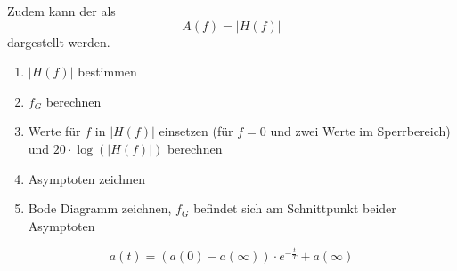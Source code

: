 \documentclass[12pt, a4paper, twoside]{scrartcl}
\begin{document}
Zudem kann der   als
\[A(f) = |H(f)|\]
dargestellt werden.


\begin{enumerate}
\item \(|H(f)|\) bestimmen
\item \(f_G\) berechnen
\item Werte für \(f\) in \(|H(f)|\) einsetzen (für \(f=0\) und zwei Werte im Sperrbereich) und \(20\cdot\log(|H(f)|)\) berechnen
\item Asymptoten zeichnen
\item Bode Diagramm zeichnen, \(f_G\) befindet sich am Schnittpunkt beider Asymptoten
\end{enumerate}

\[a(t) = (a(0) - a(\infty)) \cdot e^{-\frac{t}{T}} + a(\infty)\]

\newpage
{}%
\addtocounter{section}{1}

\newpage
{}%
\addtocounter{subsection}{1}


\newpage
{}%
\addtocounter{subsection}{1}


\newpage
{}%
\addtocounter{subsection}{1}

\end{document}
